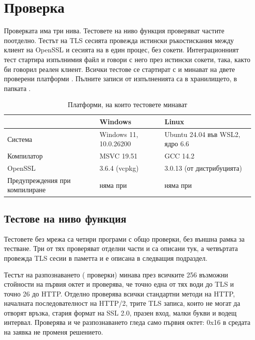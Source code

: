 \section{Проверка}
\label{sec:verification}

Проверката има три нива. Тестовете на ниво функция проверяват частите поотделно. Тестът
на TLS сесията провежда истински ръкостискания между клиент на OpenSSL и сесията на
 в един процес, без сокети. Интеграционният тест стартира изпълнимия файл и
говори с него през истински сокети, така, както би говорил реален клиент. Всички тестове
се стартират с  и минават на двете проверени платформи
. Пълните записи от изпълненията са в хранилището, в папката
.

\begin{table}[H]
\centering
\caption{Платформи, на които тестовете минават}
\label{tab:platforms}
\begin{tabularx}{\textwidth}{@{}lYY@{}}
\toprule
 & Windows & Linux \\
\midrule
Система & Windows 11, 10.0.26200 & Ubuntu 24.04 във WSL2, ядро 6.6 \\
Компилатор & MSVC 19.51 & GCC 14.2 \\
OpenSSL & 3.6.4 (vcpkg) & 3.0.13 (от дистрибуцията) \\
Предупреждения при компилиране & няма при  & няма при
   \\
\bottomrule
\end{tabularx}
\end{table}

\subsection{Тестове на ниво функция}

Тестовете без мрежа са четири програми с общо \checksUnitTotal{} проверки, без външна
рамка за тестване. Три от тях проверяват отделни части и са описани тук, а четвъртата
провежда TLS сесии в паметта и е описана в следващия подраздел.

Тестът на разпознаването (\checksClassify{} проверки) минава през всичките 256 възможни
стойности на първия октет и проверява, че точно една от тях води до TLS и точно 26 до
HTTP. Отделно проверява всички стандартни методи на HTTP, началната последователност на
HTTP/2, трите TLS записа, които не могат да отворят връзка, стария формат на SSL 2.0,
празен вход, малки букви и водещ интервал. Проверява и че разпознаването гледа само
първия октет: 0x16 в средата на заявка не променя решението.

